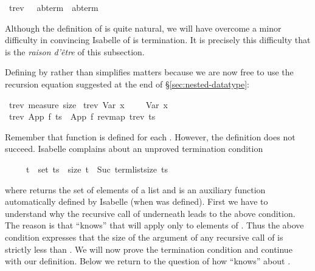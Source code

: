 %
\begin{isabellebody}%
\def\isabellecontext{Nested1}%
\ trev\ \ {\isacharcolon}{\isacharcolon}\ {\isachardoublequote}{\isacharparenleft}{\isacharprime}a{\isacharcomma}{\isacharprime}b{\isacharparenright}term\ {\isasymRightarrow}\ {\isacharparenleft}{\isacharprime}a{\isacharcomma}{\isacharprime}b{\isacharparenright}term{\isachardoublequote}%
\begin{isamarkuptext}%
\noindent
Although the definition of  is quite natural, we will have
overcome a minor difficulty in convincing Isabelle of is termination.
It is precisely this difficulty that is the \textit{raison d'\^etre} of
this subsection.

Defining  by  rather than 
simplifies matters because we are now free to use the recursion equation
suggested at the end of \S\ref{sec:nested-datatype}:%
\end{isamarkuptext}%
\ trev\ {\isachardoublequote}measure\ size{\isachardoublequote}\isanewline
\ {\isachardoublequote}trev\ {\isacharparenleft}Var\ x{\isacharparenright}\ \ \ \ {\isacharequal}\ Var\ x{\isachardoublequote}\isanewline
\ {\isachardoublequote}trev\ {\isacharparenleft}App\ f\ ts{\isacharparenright}\ {\isacharequal}\ App\ f\ {\isacharparenleft}rev{\isacharparenleft}map\ trev\ ts{\isacharparenright}{\isacharparenright}{\isachardoublequote}%
\begin{isamarkuptext}%
\noindent
Remember that function  is defined for each .
However, the definition does not succeed. Isabelle complains about an
unproved termination condition
\begin{isabelle}%
\ \ \ \ \ t\ {\isasymin}\ set\ ts\ {\isasymlongrightarrow}\ size\ t\ {\isacharless}\ Suc\ {\isacharparenleft}term{\isacharunderscore}list{\isacharunderscore}size\ ts{\isacharparenright}%
\end{isabelle}
where  returns the set of elements of a list
and  is an auxiliary
function automatically defined by Isabelle
(when  was defined).  First we have to understand why the
recursive call of  underneath  leads to the above
condition. The reason is that  ``knows'' that 
will apply  only to elements of . Thus the above
condition expresses that the size of the argument  of any
recursive call of  is strictly less than .  We will now prove the termination condition and
continue with our definition.  Below we return to the question of how
 ``knows'' about .%
\end{isamarkuptext}%
\end{isabellebody}%
